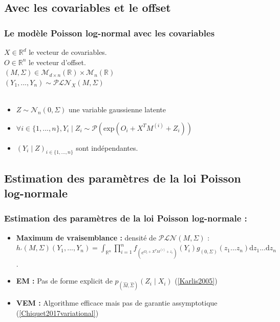\documentclass[11pt),table]{beamer}
\begin{document}
\subsection{Avec les covariables et le offset}

\begin{frame}
\frametitle{Le modèle Poisson log-normal avec les covariables}
$X \in \mathbb{R}^d$ le vecteur de covariables.\\
$O \in \mathbb{R}^n$ le vecteur d'offset.\\
\vspace{0.5cm}
$(M, \Sigma) \in \mathcal{M}_{d \times n}(\mathbb{R}) \times \mathcal{M}_n(\mathbb{R})$\\
\vspace{0.5cm}
$(Y_1,...,Y_n) \sim \mathcal{PLN}_X (M,\Sigma)$  \\
\\
\begin{itemize}
\item  $Z \sim \mathcal{N}_n(0,\Sigma)$ une variable gaussienne  latente

\item$\forall i \in \{1,...,n\}, Y_i\mid Z_i \sim \mathcal{P}(\mathrm{exp}(O_i+X^T M^{(i)}+Z_i))$\\

\item $(Y_i\mid Z )_{i \in \{1,...,n\}}$ sont indépendantes.
\end{itemize}
\end{frame}
\subsection{Estimation des paramètres de la loi Poisson log-normale}
\begin{frame}
\frametitle{Estimation des paramètres de la loi Poisson log-normale :}
\begin{itemize}
\item \textbf{Maximum de vraisemblance :} densité de $\mathcal{PLN}(M,\Sigma)$ : $h_'(M,\Sigma)(Y_1,...,Y_n) = \int_{\mathbb{R}^n} \prod_{i=1}^n f_{(e^{O_i+X^T M^{(i)} + z_i})}(Y_i) g_{(0,\Sigma)}(z_1...z_n) \mathrm{d}z_1...\mathrm{d}z_n$.
\item \textbf{EM :} Pas de forme explicit de $p_{(\widehat{M},\widehat{\Sigma})}(Z_i \mid X_i)$ (\ref{Karlis2005})
\item \textbf{VEM :} Algorithme efficace mais pas de garantie assymptotique (\ref{Chiquet2017variational})
\end{itemize}
\end{frame}
\end{document}
